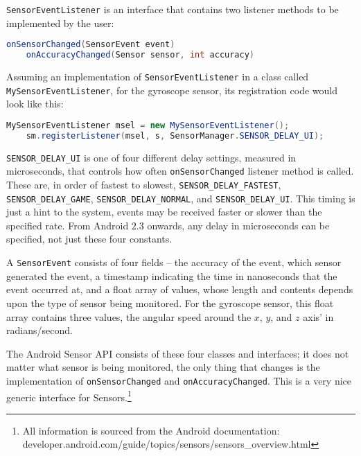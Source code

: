 \documentclass[paper=letter, fontsize=11pt]{scrartcl}
\numberwithin{equation}{section}
\numberwithin{figure}{section}
\numberwithin{table}{section}
\begin{document}
\par
\texttt{SensorEventListener} is an interface that contains two listener
methods to be implemented by the user:

\begin{lstlisting}[basicstyle=\small,language=Java]
	onSensorChanged(SensorEvent event)
	onAccuracyChanged(Sensor sensor, int accuracy)
\end{lstlisting}

\par
Assuming an implementation of \texttt{SensorEventListener} in a class called
\texttt{My\-Sen\-sor\-Event\-List\-ener}, for the gyroscope sensor, its
registration code would look like this:

\begin{lstlisting}[basicstyle=\small,language=Java]
	MySensorEventListener msel = new MySensorEventListener();
	sm.registerListener(msel, s, SensorManager.SENSOR_DELAY_UI);
\end{lstlisting}

\par
\texttt{SENSOR\_DELAY\_UI} is one of four different delay settings, measured in
microseconds, that controls how often \texttt{onSensorChanged} listener method
is called.
These are, in order of fastest to slowest,
\texttt{SENSOR\_DELAY\_FASTEST}, \texttt{SENSOR\_DELAY\_GAME},
\texttt{SENSOR\_DELAY\_NORMAL}, and \texttt{SEN\-SOR\_\-DE\-LAY\_\-UI}. This
timing is just a hint to the system, events may be received faster or slower than the
specified rate. From Android $2.3$ onwards, any delay in microseconds can be
specified, not just these four constants.
\newline

\par
A \texttt{SensorEvent} consists of four fields -- the accuracy of the event,
which sensor generated the event, a timestamp indicating the time in
nanoseconds that the event occurred at, and a float array of values, whose
length and contents depends upon the type of sensor being monitored. For the
gyroscope sensor, this float array contains three values, the angular speed
around the $x$, $y$, and $z$ axis' in radians/second.
\newline

\par
The Android Sensor \ac{API} consists of these four classes and interfaces; it
does not matter what sensor is being monitored, the only thing that changes is
the implementation of \texttt{on\-Sen\-sor\-Changed} and
\texttt{onAccuracyChanged}.
This is a very nice generic interface for Sensors.\footnote{All information is
sourced from the Android documentation:\\
developer.android.com/guide/topics/sensors/sensors\_overview.html}
\end{document}
